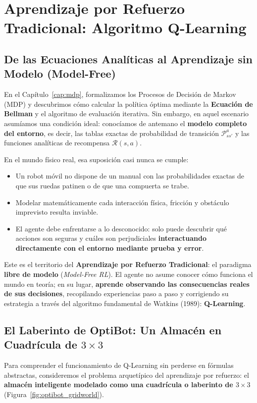 \chapter{Aprendizaje por Refuerzo Tradicional: Algoritmo Q-Learning}
\label{cap:rl_tradicional}
\label{cap:qlearning}
\label{cap:td}
\label{cap:dp}

\section{De las Ecuaciones Analíticas al Aprendizaje sin Modelo (Model-Free)}
En el Capítulo~\ref{cap:mdp}, formalizamos los Procesos de Decisión de Markov (MDP) y descubrimos cómo calcular la política óptima mediante la \textbf{Ecuación de Bellman} y el algoritmo de evaluación iterativa. Sin embargo, en aquel escenario asumíamos una condición ideal: conocíamos de antemano el \textbf{modelo completo del entorno}, es decir, las tablas exactas de probabilidad de transición $\mathcal{P}_{ss'}^a$ y las funciones analíticas de recompensa $\mathcal{R}(s, a)$.

En el mundo físico real, esa suposición casi nunca se cumple:
\begin{itemize}
  \item Un robot móvil no dispone de un manual con las probabilidades exactas de que sus ruedas patinen o de que una compuerta se trabe.
  \item Modelar matemáticamente cada interacción física, fricción y obstáculo imprevisto resulta inviable.
  \item El agente debe enfrentarse a lo desconocido: solo puede descubrir qué acciones son seguras y cuáles son perjudiciales \textbf{interactuando directamente con el entorno mediante prueba y error}.
\end{itemize}

Este es el territorio del \textbf{Aprendizaje por Refuerzo Tradicional}: el paradigma \textbf{libre de modelo} (\textit{Model-Free RL}). El agente no asume conocer cómo funciona el mundo en teoría; en su lugar, \textbf{aprende observando las consecuencias reales de sus decisiones}, recopilando experiencias paso a paso y corrigiendo su estrategia a través del algoritmo fundamental de Watkins (1989): \textbf{Q-Learning}.

\section{El Laberinto de OptiBot: Un Almacén en Cuadrícula de \texorpdfstring{$3 \times 3$}{3x3}}
Para comprender el funcionamiento de Q-Learning sin perderse en fórmulas abstractas, consideremos el problema arquetípico del aprendizaje por refuerzo: el \textbf{almacén inteligente modelado como una cuadrícula o laberinto de $3 \times 3$} (Figura~\ref{fig:optibot_gridworld}).

